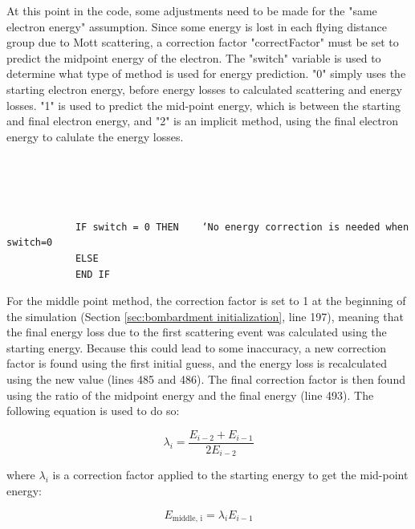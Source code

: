 \documentclass[10pt, reqno]{exam}
\begin{document}
At this point in the code, some adjustments need to be made for the "same electron energy" assumption. Since some energy is lost in each flying distance group due to Mott scattering, a correction factor "correctFactor" must be set to predict the midpoint energy of the electron. The "switch" variable is used to determine what type of method is used for energy prediction. "0" simply uses the starting electron energy, before energy losses to calculated scattering and energy losses. "1" is used to predict the mid-point energy, which is between the starting and final electron energy, and "2" is an implicit method, using the final electron energy to calulate the energy losses. \par

\begin{verbatim}

    
    
    
            IF switch = 0 THEN    ‘No energy correction is needed when switch=0
            ELSE
            END IF
\end{verbatim}
For the middle point method, the correction factor is set to 1 at the beginning of the simulation (Section \ref{sec:bombardment initialization}, line 197), meaning that the final energy loss due to the first scattering event was calculated using the starting energy. Because this could lead to some inaccuracy, a new correction factor is found using the first initial guess, and the energy loss is recalculated using the new value (lines 485 and 486). The final correction factor is then found using the ratio of the midpoint energy and the final energy (line 493). The following equation is used to do so: \par

\begin{equation}
    \lambda_i = \frac{E_{i - 2} + E_{i - 1}}{2E_{i-2}}
\end{equation}

where $\lambda_i$ is a correction factor applied to the starting energy to get the mid-point energy:

\begin{equation}
    E_{\text{middle, i}} = \lambda_i E_{i - 1}
\end{equation}
\end{document}
